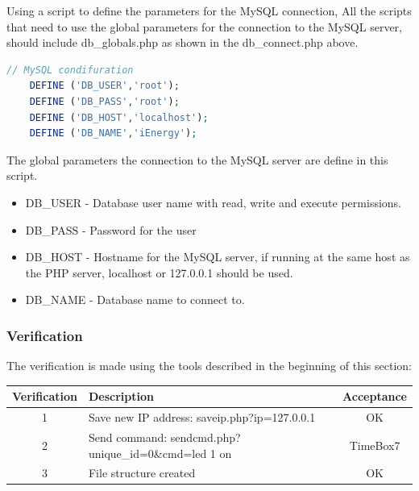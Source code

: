 
Using a script to define the parameters for the MySQL connection, 
All the scripts that need to use the global parameters for the connection to the MySQL server, should include db\_globals.php as shown in the db\_connect.php above.

\begin{lstlisting}[language=php]
	// MySQL condifuration
	DEFINE ('DB_USER','root');
	DEFINE ('DB_PASS','root');
	DEFINE ('DB_HOST','localhost');
	DEFINE ('DB_NAME','iEnergy');
\end{lstlisting}

The global parameters the connection to the MySQL server are define in this script.

\begin{itemize}
	\item DB\_USER - Database user name with read, write and execute permissions.
	\item DB\_PASS - Password for the user
	\item DB\_HOST - Hostname for the MySQL server, if running at the same host as the PHP server, localhost or 127.0.0.1 should be used.
	\item DB\_NAME - Database name to connect to.
\end{itemize}

\subsubsection{Verification}
%
The verification is made using the tools described in the beginning of this section:
\begin{table}[H]
\centering
	\begin{tabular}{| c | l | c |}
		\hline
		Verification & Description & Acceptance \\\hline
		1 & Save new IP address: saveip.php?ip=127.0.0.1 & OK \\\hline
		2 & Send command: sendcmd.php?unique\_id=0\&cmd=led 1 on & TimeBox7 \\\hline
		3 & File structure created & OK \\\hline
	\end{tabular}
\end{table}

